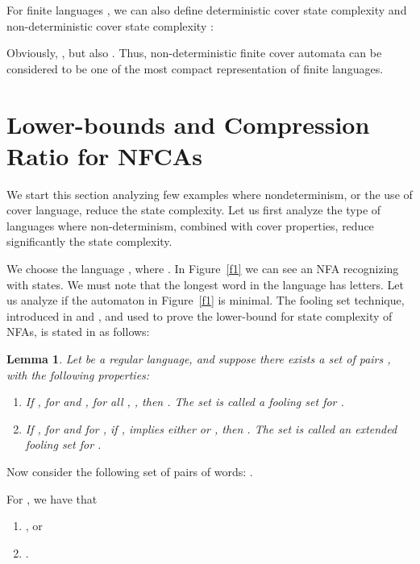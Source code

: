 \documentclass[submission,copyright,creativecommons]{eptcs}
\newtheorem{lemma}{Lemma}
\begin{document}
For finite  languages , we can also define deterministic cover state complexity 
and non-deterministic cover state complexity :


 

Obviously,  , but also 
.
Thus, non-deterministic finite cover automata can be considered to be one of 
the most compact representation of finite languages.

\section{Lower-bounds and Compression Ratio for NFCAs}
\label{slowerbounds}

We start this section analyzing few examples where nondeterminism, 
or the use of cover language, reduce the state complexity.
Let us first analyze the type of languages where non-determinism, combined with cover properties,
 reduce significantly the state complexity.

We choose the language 
 , where .
In Figure~\ref{f1} we can see an NFA recognizing  with  states.
We must note that the longest word in the language 
has  letters.
Let us analyze if the automaton in Figure~\ref{f1}  is minimal.
The fooling set technique, introduced in \cite{Chrobak} and \cite{gramlich}, and used to prove the lower-bound 
for state complexity of NFAs,  is  stated in \cite{birget,Chrobak} as follows:

\begin{lemma}
\label{lfst1}
Let  be a regular language, and suppose there  exists a set of pairs 
, with the following properties:
\begin{enumerate}
 \item 
  \label{sfst}
  If , for  and , for all 
, , then . The set  is called {\em a fooling set} for .
 \item 
 \label{extfst}
If , for  and for , if , implies  
either  
or , 
 then . The set  is called {\em an extended fooling set} for .
\end{enumerate}
\end{lemma}

Now consider the following set of pairs of words:
.

For , we have  that
\begin{enumerate}
 \item , or
 \item .
\end{enumerate}
\end{document}
